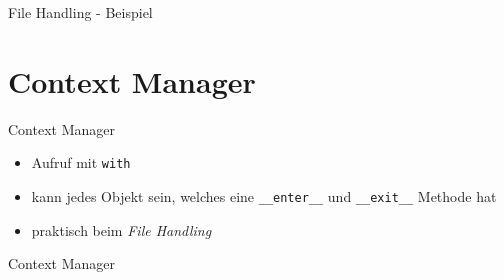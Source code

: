 \begin{frame}{File Handling - Beispiel}
	
\end{frame}


\section{Context Manager}

\begin{frame}{Context Manager}
	\begin{itemize}
		\item Aufruf mit \alert{\texttt{with}}
		\item kann jedes Objekt sein, welches eine \texttt{\_\_enter\_\_} und \texttt{\_\_exit\_\_} Methode hat
		\item praktisch beim \textit{File Handling}
	\end{itemize}
\end{frame}

\begin{frame}{Context Manager}
	
\end{frame}



